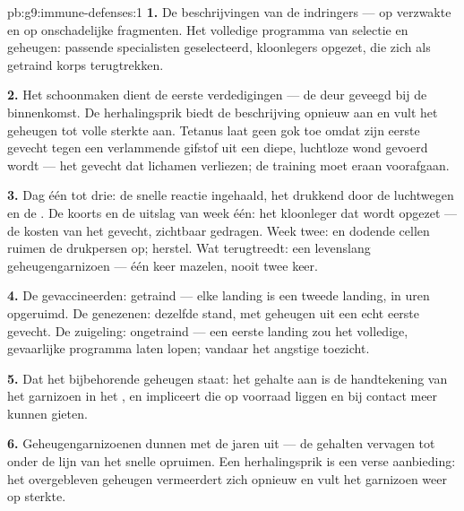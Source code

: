 \begin{solution}{pb:g9:immune-defenses:1}
\textbf{1.} De beschrijvingen van de indringers ---  op
verzwakte  en op onschadelijke fragmenten. Het volledige
programma van selectie en geheugen: passende specialisten
geselecteerd, kloonlegers opgezet,  die zich als
getraind korps terugtrekken.

\textbf{2.} Het schoonmaken dient de eerste verdedigingen --- de
deur geveegd bij de binnenkomst. De herhalingsprik biedt de
beschrijving opnieuw aan en vult het geheugen tot volle sterkte
aan. Tetanus laat geen gok toe omdat zijn eerste gevecht tegen een
verlammende gifstof uit een diepe, luchtloze wond gevoerd wordt ---
het  gevecht dat lichamen verliezen; de training moet eraan
voorafgaan.

\textbf{3.} Dag één tot drie: de snelle reactie ingehaald, het
 drukkend door de luchtwegen en de . De koorts en de
uitslag van week één: het kloonleger dat wordt opgezet --- de
kosten van het gevecht, zichtbaar gedragen. Week twee: 
en dodende cellen ruimen de drukpersen op; herstel. Wat terugtreedt:
een levenslang geheugengarnizoen --- één keer mazelen, nooit twee
keer.

\textbf{4.} De gevaccineerden: getraind --- elke landing is een
tweede landing, in uren opgeruimd. De genezenen: dezelfde stand,
met geheugen uit een echt eerste gevecht. De zuigeling: ongetraind
--- een eerste landing zou het volledige, gevaarlijke programma
laten lopen; vandaar het angstige toezicht.

\textbf{5.} Dat het bijbehorende geheugen staat: het gehalte aan
 is de handtekening van het garnizoen in het , en
impliceert  die op voorraad liggen en bij contact
meer kunnen gieten.

\textbf{6.} Geheugengarnizoenen dunnen met de jaren uit --- de
gehalten vervagen tot onder de lijn van het snelle opruimen. Een
herhalingsprik is een verse aanbieding: het overgebleven geheugen
vermeerdert zich opnieuw en vult het garnizoen weer op sterkte.


\end{solution}
